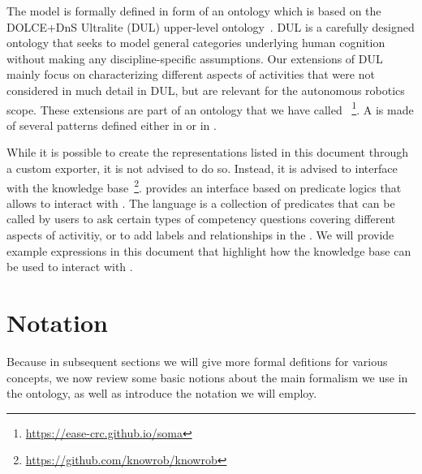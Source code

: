 The \neem model is formally defined in form of an \owl ontology which is based on the DOLCE+DnS Ultralite (DUL) upper-level ontology~\cite{DOLCE2003}.
DUL is a carefully designed ontology that seeks to model general categories underlying human cognition without making any discipline-specific assumptions.
Our extensions of DUL mainly focus on characterizing different aspects of activities that were not considered in much detail in DUL, but are relevant for the autonomous robotics scope.
These extensions are part of an ontology that we have called
\soma~\footnote{\url{https://ease-crc.github.io/soma}}.
A \neem is made of several patterns defined either in \dul or in \soma.

While it is possible to create the representations listed in this document through a custom exporter, it is not advised to do so.
Instead, it is advised to interface with the
\knowrob knowledge base~\footnote{\url{https://github.com/knowrob/knowrob}}.
\knowrob provides an interface based on predicate logics that allows to interact with \neems.
The language is a collection of predicates that can be called by users to ask certain types of competency questions covering different aspects of activitiy, or to add labels and relationships in the \neemnar.
We will provide example expressions in this document that highlight how the knowledge base can be used to interact with \neems.

\lipsum[4]

\section{Notation} %
\label{sec:notation}

Because in subsequent sections we will give more formal defitions for various concepts, we now review some basic notions about the main formalism we use in the ontology, as well as introduce the notation we will employ.

